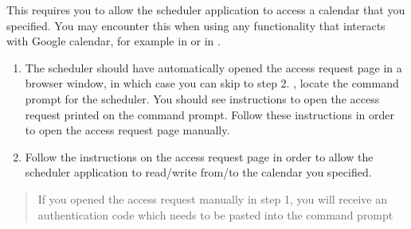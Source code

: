 \documentclass[letterpaper,10pt,english]{sphinxmanual}
\begin{document}
This requires you to allow the scheduler application to access a calendar
that you specified. You may encounter this when using any functionality that
interacts with Google calendar, for example in {\hyperref[\detokenize{index:generating-a-schedule}]{}}
or in {\hyperref[\detokenize{index:publishing-a-schedule-to-google-calendar}]{}}.
\begin{enumerate}
\item {} 
The scheduler should have automatically opened the access request page
in a browser window, in which case you can skip to step 2. ,
locate the command prompt for the scheduler. You should see instructions
to open the access request printed on the command prompt. Follow these instructions
in order to open the access request page manually.

\end{enumerate}

\begin{figure}[htbp]
\centering
{}\end{figure}

\begin{DUlineblock}{0em}
\item[] 
\end{DUlineblock}
\begin{enumerate}
\setcounter{enumi}{1}
\item {} 
Follow the instructions on the access request page in order to allow
the scheduler application to read/write from/to the calendar you specified.

\end{enumerate}

\begin{figure}[htbp]
\centering
{}\end{figure}

\begin{DUlineblock}{0em}
\item[] 
\end{DUlineblock}
\begin{quote}

 If you opened the access request manually in step 1, you will
receive an authentication code which needs to be pasted into the command prompt
\end{quote}
\end{document}
